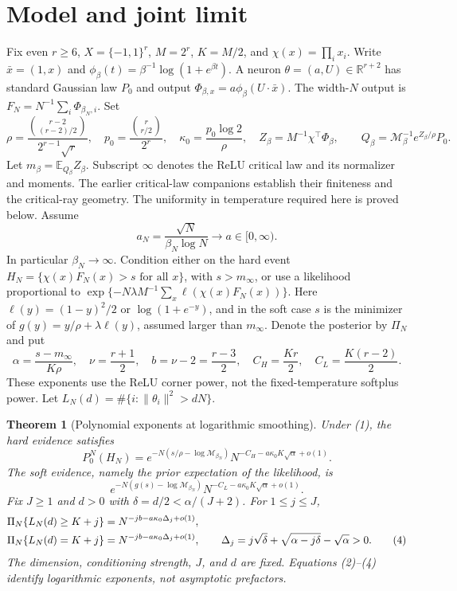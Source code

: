 \documentclass[11pt]{article}
\newtheorem{theorem}{Theorem}\newtheorem{lemma}[theorem]{Lemma}
\newcommand{\E}{\mathbb E}\newcommand{\R}{\mathbb R}
\begin{document}
\section{Model and joint limit}
Fix even $r\ge6$, $X=\{-1,1\}^r$, $M=2^r$, $K=M/2$, and
$\chi(x)=\prod_i x_i$. Write $\bar x=(1,x)$ and
$\phi_\beta(t)=\beta^{-1}\log(1+e^{\beta t})$.
A neuron $\theta=(a,U)\in\R^{r+2}$ has standard Gaussian law $P_0$ and
output $\Phi_{\beta,x}=a\phi_\beta(U\cdot\bar x)$.
The width-$N$ output is $F_N=N^{-1}\sum_i\Phi_{\beta_N,i}$.
Set
\[
 \rho=\frac{\binom{r-2}{(r-2)/2}}{2^{r-1}\sqrt r},\quad
 p_0=\frac{\binom r{r/2}}{2^r},\quad
 \kappa_0=\frac{p_0\log2}{\rho},\quad
 Z_\beta=M^{-1}\chi^\top\Phi_\beta,
 \qquad Q_\beta=\mathcal M_\beta^{-1}e^{Z_\beta/\rho}P_0.
\]
Let $m_\beta=\E_{Q_\beta}Z_\beta$. Subscript $\infty$ denotes the ReLU
critical law and its normalizer and moments. The earlier critical-law
companions establish their finiteness and the critical-ray geometry.
The uniformity in temperature required here is proved below.
Assume
\[
        a_N=\frac{\sqrt N}{\beta_N\log N}\longrightarrow
                       a\in[0,\infty).                 \tag{1}
\]
In particular $\beta_N\to\infty$. Condition either on the hard event
$H_N=\{\chi(x)F_N(x)>s\text{ for all }x\}$, with $s>m_\infty$,
or use a likelihood proportional to
$\exp\{-N\lambda M^{-1}\sum_x\ell(\chi(x)F_N(x))\}$.
Here $\ell(y)=(1-y)^2/2$ or $\log(1+e^{-y})$, and in the soft case
$s$ is the minimizer of $g(y)=y/\rho+\lambda\ell(y)$, assumed larger
than $m_\infty$. Denote the posterior by $\Pi_N$ and put
\[
 \alpha=\frac{s-m_\infty}{K\rho},\quad
 \nu=\frac{r+1}{2},\quad b=\nu-2=\frac{r-3}{2},\quad
 C_H=\frac{Kr}{2},\quad C_L=\frac{K(r-2)}{2}.
\]
These exponents use the ReLU corner power, not the fixed-temperature
softplus power. Let $L_N(d)=\#\{i:\|\theta_i\|^2>dN\}$.

\begin{theorem}[Polynomial exponents at logarithmic smoothing]\label{thm:main}
Under (1), the hard evidence satisfies
\[
 P_0^N(H_N)=
 e^{-N(s/\rho-\log\mathcal M_{\beta_N})}
 N^{-C_H-a\kappa_0K\sqrt\alpha+o(1)}.                  \tag{2}
\]
The soft evidence, namely the prior expectation of the likelihood, is
\[
 e^{-N(g(s)-\log\mathcal M_{\beta_N})}
 N^{-C_L-a\kappa_0K\sqrt\alpha+o(1)}.                  \tag{3}
\]
Fix $J\ge1$ and $d>0$ with $\delta=d/2<\alpha/(J+2)$. For $1\le j\le J$,
\begin{align}
 \Pi_N\{L_N(d)\ge K+j\}
   &=N^{-jb-a\kappa_0\Delta_j+o(1)},\notag\\
 \Pi_N\{L_N(d)=K+j\}
   &=N^{-jb-a\kappa_0\Delta_j+o(1)},\qquad
 \Delta_j=j\sqrt\delta+\sqrt{\alpha-j\delta}-\sqrt\alpha>0.
                                                               \tag{4}
\end{align}
The dimension, conditioning strength, $J$, and $d$ are fixed. Equations
(2)--(4) identify logarithmic exponents, not asymptotic prefactors.
\end{theorem}
\end{document}
